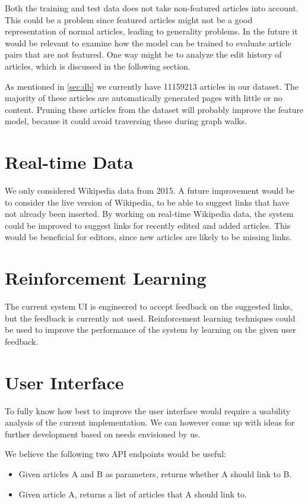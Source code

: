 Both the training and test data does not take non-featured articles into account. This could be a problem since featured articles might not be a good representation of normal articles, leading to generality problems. In the future it would be relevant to examine how the model can be trained to evaluate article pairs that are not featured. One way might be to analyze the edit history of articles, which is discussed in the following section. %

As mentioned in \cref{sec:db} we currently have \num{11159213} articles in our dataset. The majority of these articles are automatically generated pages with little or no content. Pruning these articles from the dataset will probably improve the feature model, because it could avoid traversing these during graph walks.

\section{Real-time Data}
We only considered Wikipedia data from 2015. A future improvement would be to consider the live version of Wikipedia, to be able to suggest links that have not already been inserted.
By working on real-time Wikipedia data, the system could be improved to suggest links for recently edited and added articles. This would be beneficial for editors, since new articles are likely to be missing links.

\section{Reinforcement Learning}
The current system UI is engineered to accept feedback on the suggested links, but the feedback is currently not used. Reinforcement learning techniques could be used to improve the performance of the system by learning on the given user feedback.

\section{User Interface}
To fully know how best to improve the user interface would require a usability analysis of the current implementation. We can however come up with ideas for further development based on needs envisioned by us.

We believe the following two API endpoints would be useful:
\begin{itemize}
    \item Given articles A and B as parameters, returns whether A should link to B.
    \item Given article A, returns a list of articles that A should link to.
\end{itemize}

